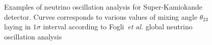 \begin{figure}[htb!]
\begin{center}
\caption{\label{theta23}Examples of neutrino oscillation analysis for Super-Kamiokande detector. Curves corresponds to various values of mixing angle $\theta_{23}$ laying in $1\sigma$ interval according to Fogli~\emph{et al.} global neutrino oscillation analysis}
\end{center}
\end{figure}

